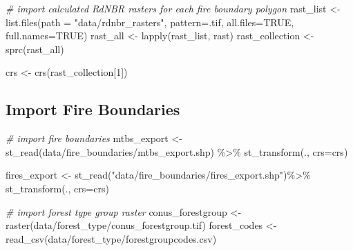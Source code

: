 \documentclass[
]{book}
\newenvironment{Shaded}{\begin{snugshade}}{\end{snugshade}}
\newcommand{\AttributeTok}[1]{\textcolor[rgb]{0.77,0.63,0.00}{#1}}
\newcommand{\CommentTok}[1]{\textcolor[rgb]{0.56,0.35,0.01}{\textit{#1}}}
\newcommand{\ConstantTok}[1]{\textcolor[rgb]{0.00,0.00,0.00}{#1}}
\newcommand{\DecValTok}[1]{\textcolor[rgb]{0.00,0.00,0.81}{#1}}
\newcommand{\FunctionTok}[1]{\textcolor[rgb]{0.00,0.00,0.00}{#1}}
\newcommand{\NormalTok}[1]{#1}
\newcommand{\OtherTok}[1]{\textcolor[rgb]{0.56,0.35,0.01}{#1}}
\newcommand{\SpecialCharTok}[1]{\textcolor[rgb]{0.00,0.00,0.00}{#1}}
\newcommand{\StringTok}[1]{\textcolor[rgb]{0.31,0.60,0.02}{#1}}
\begin{document}
\begin{Shaded}
\begin{Highlighting}[]
\CommentTok{\# import calculated RdNBR rasters for each fire boundary polygon}
\NormalTok{rast\_list }\OtherTok{\textless{}{-}} \FunctionTok{list.files}\NormalTok{(}\AttributeTok{path =} \StringTok{"data/rdnbr\_rasters"}\NormalTok{, }\AttributeTok{pattern=}\StringTok{\textquotesingle{}.tif\textquotesingle{}}\NormalTok{, }\AttributeTok{all.files=}\ConstantTok{TRUE}\NormalTok{, }\AttributeTok{full.names=}\ConstantTok{TRUE}\NormalTok{)}
\NormalTok{rast\_all }\OtherTok{\textless{}{-}} \FunctionTok{lapply}\NormalTok{(rast\_list, rast)}
\NormalTok{rast\_collection }\OtherTok{\textless{}{-}} \FunctionTok{sprc}\NormalTok{(rast\_all)}

\NormalTok{crs }\OtherTok{\textless{}{-}} \FunctionTok{crs}\NormalTok{(rast\_collection[}\DecValTok{1}\NormalTok{])}
\end{Highlighting}
\end{Shaded}

\hypertarget{import-fire-boundaries}{%
\subsection{Import Fire Boundaries}\label{import-fire-boundaries}}

\begin{Shaded}
\begin{Highlighting}[]
\CommentTok{\# import fire boundaries}
\NormalTok{mtbs\_export }\OtherTok{\textless{}{-}} \FunctionTok{st\_read}\NormalTok{(}\StringTok{\textquotesingle{}data/fire\_boundaries/mtbs\_export.shp\textquotesingle{}}\NormalTok{) }\SpecialCharTok{\%\textgreater{}\%} 
  \FunctionTok{st\_transform}\NormalTok{(., }\AttributeTok{crs=}\NormalTok{crs) }

\NormalTok{fires\_export }\OtherTok{\textless{}{-}} \FunctionTok{st\_read}\NormalTok{(}\StringTok{"data/fire\_boundaries/fires\_export.shp"}\NormalTok{)}\SpecialCharTok{\%\textgreater{}\%} 
  \FunctionTok{st\_transform}\NormalTok{(., }\AttributeTok{crs=}\NormalTok{crs)}

\CommentTok{\# import forest type group raster}
\NormalTok{conus\_forestgroup }\OtherTok{\textless{}{-}} \FunctionTok{raster}\NormalTok{(}\StringTok{\textquotesingle{}data/forest\_type/conus\_forestgroup.tif\textquotesingle{}}\NormalTok{)}
\NormalTok{forest\_codes }\OtherTok{\textless{}{-}} \FunctionTok{read\_csv}\NormalTok{(}\StringTok{\textquotesingle{}data/forest\_type/forestgroupcodes.csv\textquotesingle{}}\NormalTok{)}
\end{Highlighting}
\end{Shaded}
\end{document}
